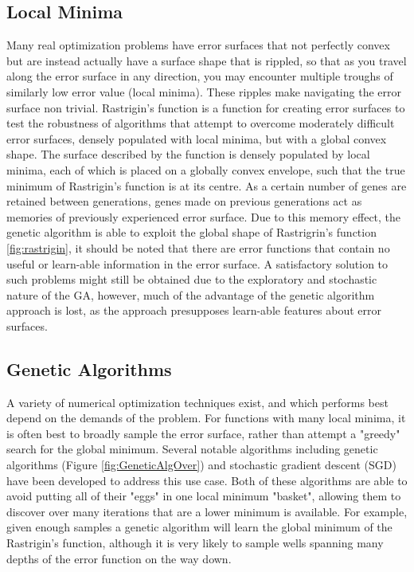 \subsection{Local Minima} Many real optimization problems have error surfaces that not perfectly convex but are instead actually have a surface shape that is rippled, so that as you travel along the error surface in any direction, you may encounter multiple troughs of similarly low error value (local minima).
These ripples make navigating the error surface non trivial.
Rastrigin's function \cite{rastrigin1974systems}  is a function for creating error surfaces to test the robustness of algorithms that attempt to overcome moderately difficult error surfaces, densely populated with local minima, but with a global convex shape.
The surface described by the function is densely populated by local minima, each of which is placed on a globally convex envelope, such that the true minimum of Rastrigin's function is at its centre. As a certain number of genes are retained between generations, genes made on previous generations act as memories of previously experienced error surface. Due to this memory effect, the genetic algorithm is able to exploit the global shape of Rastrigrin's function \ref{fig:rastrigin}, it should be noted that there are error functions that contain no useful or learn-able information in the error surface. A satisfactory solution to such problems might still be obtained due to the exploratory and stochastic nature of the GA, however, much of the advantage of the genetic algorithm approach is lost, as the approach presupposes learn-able features about error surfaces. 

\subsection{Genetic Algorithms}
A variety of numerical optimization techniques exist, and which performs best depend on the demands of the problem.
For functions with many local minima, it is often best to broadly sample the error surface, rather than attempt a "greedy" search for the global minimum.
Several notable algorithms including genetic algorithms (Figure \ref{fig:GeneticAlgOver}) and stochastic gradient descent (SGD) have been developed to address this use case.
Both of these algorithms are able to avoid putting all of their "eggs" in one local minimum "basket", allowing them to discover over many iterations that are a lower minimum is available.
For example, given enough samples a genetic algorithm will learn the global minimum of the Rastrigin's function, although it is very likely to sample wells spanning many depths of the error function on the way down.

